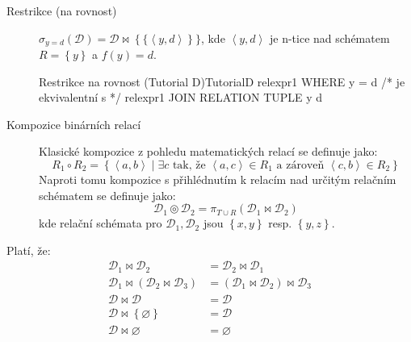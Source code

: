 \begin{description}
\item[Restrikce (na rovnost)] $\sigma_{y = d} (\mathcal{D}) = \mathcal{D} \Join \left\{\{ \left\langle y, d \right\rangle \right\}\} $, kde $\left\langle y, d \right\rangle$ je n-tice nad schématem $R = \left\{ y \right\}$ a $f(y) = d$.
\begin{upcode}{Restrikce na rovnost (Tutorial D)}{}{TutorialD}
relexpr1 WHERE y = d
/* je ekvivalentní s */
relexpr1 JOIN RELATION {TUPLE {y d}}
\end{upcode}

\item[Kompozice binárních relací] Klasické kompozice z pohledu matematických relací se definuje jako:
$$
R_{1} \circ R_{2} = \left\{ \left\langle a, b \right\rangle \; | \; \exists c \text{ tak, že } \left\langle a, c \right\rangle \in R_{1} \text{ a zároveň } \left\langle c, b \right\rangle \in R_{2} \right\}
$$
Naproti tomu kompozice s přihlédnutím k relacím nad určitým relačním schématem se definuje jako:
$$
\mathcal{D}_{1} \circledcirc \mathcal{D}_{2} = \pi_{T \cup R} (\mathcal{D}_{1} \Join \mathcal{D}_{2})
$$
kde relační schémata pro $\mathcal{D}_{1}, \mathcal{D}_{2}$ jsou $\left\{ x, y \right\}$ resp. $\left\{ y, z \right\}$.

\end{description}
\begin{upquote}
Platí, že:
\begin{align}
\tag{Komutativita}\mathcal{D}_{1} \Join \mathcal{D}_{2} &= \mathcal{D}_{2} \Join \mathcal{D}_{1} \\
\tag{Asociativita}\mathcal{D}_{1} \Join (\mathcal{D}_{2} \Join \mathcal{D}_{3}) &= (\mathcal{D}_{1} \Join \mathcal{D}_{2}) \Join \mathcal{D}_{3} \\
\tag{Idempotence}\mathcal{D} \Join \mathcal{D} &= \mathcal{D} \\
\tag{Neutralita vůči množině obs. $\varnothing$}\mathcal{D} \Join \left\{ \varnothing \right\} &= \mathcal{D} \\
\tag{Anihilace vůči prázdné množině}\mathcal{D} \Join \varnothing &= \varnothing
\end{align}
\end{upquote}

